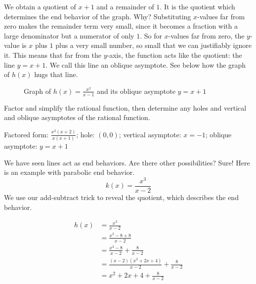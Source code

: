 We obtain a quotient of \( x + 1 \) and a remainder of \( 1 \). It is the quotient which determines the end behavior of the graph. Why? Substituting \( x \)-values far from zero makes the remainder term very small, since it becomes a fraction with a large denominator but a numerator of only \( 1 \). So for \( x \)-values far from zero, the \( y \)-value is \( x \) plus \( 1 \) plus a very small number, so small that we can justifiably ignore it. This means that far from the \( y \)-axis, the function acts like the quotient: the line \( y = x + 1 \). We call this line an oblique asymptote. See below how the graph of \( h(x) \) hugs that line.

\begin{figure}[htbp]
  \centering
  \caption{Graph of \( h(x) = \frac{x^2}{x - 1} \) and its oblique asymptote \( y = x + 1 \)}
\end{figure}

\begin{Exercise}[title=Rational Functions Practice 2, label=ratfunc2]
  Factor and simplify the rational function, then determine any holes and vertical and oblique asymptotes of the rational function.
  \vspace{40mm}
\end{Exercise}
\begin{Answer}[ref=ratfunc2]Factored form: $\frac{x^2(x + 2)}{x(x + 1)}$; hole: $(0, 0)$; vertical asymptote: $x = -1$; oblique asymptote: $y = x + 1$\end{Answer}

We have seen lines act as end behaviors. Are there other possibilities? Sure! Here is an example with parabolic end behavior. 
\[ k(x) = \frac{x^3}{x - 2} \]
We use our add-subtract trick to reveal the quotient, which describes the end behavior.

\begin{equation} \label{eq1}
\begin{split}
h(x) & = \frac{x^3}{x - 2} \\
& = \frac{x^3 - 8 + 8}{x - 2} \\ 
& = \frac{x^3 - 8}{x - 2} + \frac{8}{x - 2} \\
& = \frac{(x - 2)(x^2 + 2x + 4)}{x - 2} + \frac{8}{x - 2} \\
& = x^2 + 2x + 4 + \frac{8}{x - 2}
\end{split}
\end{equation}

